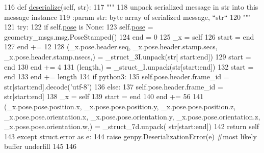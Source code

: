 \begin{DoxyCode}
116   \textcolor{keyword}{def }\hyperlink{classjaco__msgs_1_1msg_1_1__ArmPoseFeedback_1_1ArmPoseFeedback_adf1c812d9109a1501616e0f033572995}{deserialize}(self, str):
117     \textcolor{stringliteral}{"""}
118 \textcolor{stringliteral}{    unpack serialized message in str into this message instance}
119 \textcolor{stringliteral}{    :param str: byte array of serialized message, ``str``}
120 \textcolor{stringliteral}{    """}
121     \textcolor{keywordflow}{try}:
122       \textcolor{keywordflow}{if} self.\hyperlink{classjaco__msgs_1_1msg_1_1__ArmPoseFeedback_1_1ArmPoseFeedback_a9d4fd79ad0f686d06e0aec8f2b046b37}{pose} \textcolor{keywordflow}{is} \textcolor{keywordtype}{None}:
123         self.\hyperlink{classjaco__msgs_1_1msg_1_1__ArmPoseFeedback_1_1ArmPoseFeedback_a9d4fd79ad0f686d06e0aec8f2b046b37}{pose} = geometry\_msgs.msg.PoseStamped()
124       end = 0
125       \_x = self
126       start = end
127       end += 12
128       (\_x.pose.header.seq, \_x.pose.header.stamp.secs, \_x.pose.header.stamp.nsecs,) = \_struct\_3I.unpack(str[
      start:end])
129       start = end
130       end += 4
131       (length,) = \_struct\_I.unpack(str[start:end])
132       start = end
133       end += length
134       \textcolor{keywordflow}{if} python3:
135         self.pose.header.frame\_id = str[start:end].decode(\textcolor{stringliteral}{'utf-8'})
136       \textcolor{keywordflow}{else}:
137         self.pose.header.frame\_id = str[start:end]
138       \_x = self
139       start = end
140       end += 56
141       (\_x.pose.pose.position.x, \_x.pose.pose.position.y, \_x.pose.pose.position.z, 
      \_x.pose.pose.orientation.x, \_x.pose.pose.orientation.y, \_x.pose.pose.orientation.z, \_x.pose.pose.orientation.w,) = \_struct\_7d.unpack(
      str[start:end])
142       \textcolor{keywordflow}{return} self
143     \textcolor{keywordflow}{except} struct.error \textcolor{keyword}{as} e:
144       \textcolor{keywordflow}{raise} genpy.DeserializationError(e) \textcolor{comment}{#most likely buffer underfill}
145 
146 
\end{DoxyCode}
